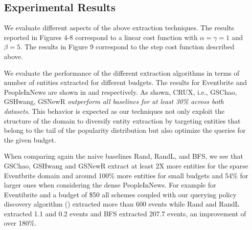 
\subsection{Experimental Results}
We evaluate different aspects of the above extraction techniques. The results reported in Figures 4-8 correspond to a linear cost function with $\alpha=\gamma=1$ and $\beta=5$. The results in Figure 9 correspond to the step cost function described above.

\vspace{3pt}
We evaluate the performance of the different extraction algorithms in terms of number of entities extracted for different budgets. The results for Eventbrite and PeopleInNews are shown in  and  respectively. As shown, CRUX, i.e., GSChao, GSHwang, GSNewR {\em outperform all baselines for at least 30\% across both datasets}. This behavior is expected as our techniques not only exploit the structure of the domain to diversify entity extraction by targeting entities that belong to the tail of the popularity distribution but also optimize the queries for the given budget.

When comparing again the naive baselines Rand, RandL, and BFS, we see that GSChao, GSHwang and GSNewR extract at least 2X more entities for the sparse Eventbrite domain and around 100\% more entities for small budgets and 54\% for larger ones when considering the dense PeopleInNews. For example for Eventibrite and a budget of \$50 all schemes coupled with our querying policy discovery algorithm () extracted more than 600 events while Rand and RandL extracted 1.1 and 0.2 events and BFS extracted 207.7 events, an improvement of over 180\%.

